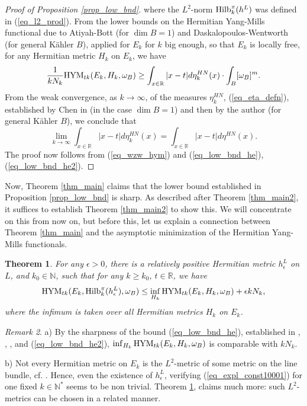 \documentclass[12pt]{article}
\numberwithin{equation}{section}
\theoremstyle{theorem}
\newtheorem{thm}{Theorem}[section]
\theoremstyle{definition}
\theoremstyle{remark}
\newtheorem{rem}[thm]{Remark}
\newcommand{\real}{\mathbb{R}}
\newcommand{\nat}{\mathbb{N}}
\begin{document}
\begin{proof}[Proof of Proposition \ref{prop_low_bnd}]
		where the $L^2$-norm ${\rm{Hilb}}_k^{\pi}(h^L)$ was defined in (\ref{eq_l2_prod}).
		From the lower bounds on the Hermitian Yang-Mills functional due to Atiyah-Bott \cite[Proposition 8.20]{AtiyahBott} (for $\dim B = 1$) and Daskalopoulos-Wentworth \cite[Lemma 2.17, Corollary 2.22, Proposition 2.25]{DaskWent} (for general Kähler $B$), applied for $E_k$ for $k$ big enough, so that $E_k$ is locally free, for any Hermitian metric $H_k$ on $E_k$, we have
		\begin{equation}\label{eq_low_bnd_he}
			\frac{1}{k N_k} {\rm{HYM}}_{t k}(E_k, H_k, \omega_B)
			\geq
			\int_{x \in \real} |x - t| d \eta_k^{HN}(x)
			\cdot
			\int_B [\omega_B]^m.
		\end{equation}
		From the weak convergence, as $k \to \infty$, of the measures $\eta_k^{HN}$, (\ref{eq_eta_defn}), established by Chen in \cite[Theorem 4.3.6]{ChenHNolyg} (in the case $\dim B = 1$) and then by the author \cite[Theorem 1.5]{FinHNII} (for general Kähler $B$), we conclude that 
		\begin{equation}\label{eq_low_bnd_he2}
			\lim_{k \to \infty}
			\int_{x \in \real} |x - t| d \eta_k^{HN}(x)
			=
			\int_{x \in \real} |x - t| d \eta^{HN}(x).
		\end{equation}
		The proof now follows from (\ref{eq_wzw_hym}) and (\ref{eq_low_bnd_he}), (\ref{eq_low_bnd_he2}).
	\end{proof}
	\par 
	Now, Theorem \ref{thm_main} claims that the lower bound established in Proposition \ref{prop_low_bnd} is sharp.
	As described after Theorem \ref{thm_main2}, it suffices to establish Theorem \ref{thm_main2} to show this.
	We will concentrate on this from now on, but before this, let us explain a connection between Theorem \ref{thm_main} and the asymptotic minimization of the Hermitian Yang-Mills functionals.
	\begin{thm}\label{thm_expl_const10001}
		For any $\epsilon > 0$, there is a relatively positive Hermitian metric $h^L_{\epsilon}$ on $L$, and $k_0 \in \nat$, such that for any $k \geq k_0$, $t \in \real$, we have
		\begin{equation}\label{eq_expl_const10001}
			{\rm{HYM}}_{t k}(E_k, {\rm{Hilb}}_k^{\pi}(h^L_{\epsilon}), \omega_B)
			\leq
			\inf_{H_k} {\rm{HYM}}_{t k}(E_k, H_k, \omega_B)
			+
			\epsilon k N_k,
		\end{equation}
		where the infimum is taken over all Hermitian metrics $H_k$ on $E_k$.
	\end{thm}
	\begin{rem}
		a) By the sharpness of the bound (\ref{eq_low_bnd_he}), established in \cite{AtiyahBott}, \cite{DaskWent}, \cite{SibleyYangMills}, and (\ref{eq_low_bnd_he2}), $\inf_{H_k} {\rm{HYM}}_{t k}(E_k, H_k, \omega_B)$ is comparable with $k N_k$.
		\par 
		b)
		Not every Hermitian metric on $E_k$ is the $L^2$-metric of some metric on the line bundle, cf. \cite{JingSunImage}. 
		Hence, even the existence of $h^L_{\epsilon}$, verifying (\ref{eq_expl_const10001}) for one fixed $k \in \nat^*$ seems to be non trivial.
		Theorem \ref{thm_expl_const10001}, claims much more: such $L^2$-metrics can be chosen in a related manner.
	\end{rem}
\end{document}
